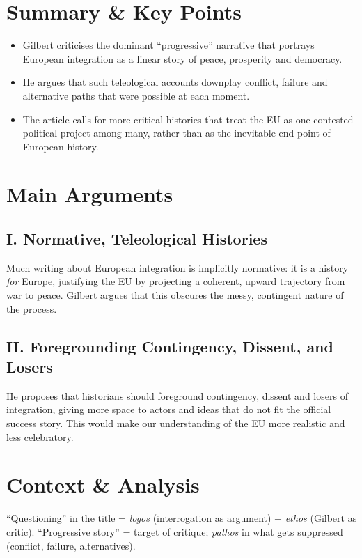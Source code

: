 \documentclass[11pt,a4paper]{article}
\begin{document}
\section*{Summary \& Key Points}

\begin{itemize}
\item Gilbert criticises the dominant ``progressive'' narrative that portrays European integration as a linear story of peace, prosperity and democracy.
\item He argues that such teleological accounts downplay conflict, failure and alternative paths that were possible at each moment.
\item The article calls for more critical histories that treat the EU as one contested political project among many, rather than as the inevitable end-point of European history.
\end{itemize}

\section*{Main Arguments}

\subsection*{I. Normative, Teleological Histories}

Much writing about European integration is implicitly normative: it is a history \textit{for} Europe, justifying the EU by projecting a coherent, upward trajectory from war to peace. Gilbert argues that this obscures the messy, contingent nature of the process.

\subsection*{II. Foregrounding Contingency, Dissent, and Losers}

He proposes that historians should foreground contingency, dissent and losers of integration, giving more space to actors and ideas that do not fit the official success story. This would make our understanding of the EU more realistic and less celebratory.

\section*{Context \& Analysis}

``Questioning'' in the title = \textit{logos} (interrogation as argument) + \textit{ethos} (Gilbert as critic). ``Progressive story'' = target of critique; \textit{pathos} in what gets suppressed (conflict, failure, alternatives).
\end{document}
